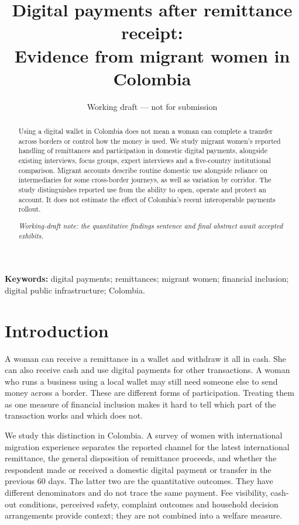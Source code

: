 \documentclass[12pt]{article}
\title{Digital payments after remittance receipt:\\ Evidence from migrant women in Colombia}
\author{}
\date{Working draft --- not for submission}
\begin{document}
\maketitle
\begin{abstract}
Using a digital wallet in Colombia does not mean a woman can complete a transfer across borders or control how the money is used. We study migrant women's reported handling of remittances and participation in domestic digital payments, alongside existing interviews, focus groups, expert interviews and a five-country institutional comparison. Migrant accounts describe routine domestic use alongside reliance on intermediaries for some cross-border journeys, as well as variation by corridor. The study distinguishes reported use from the ability to open, operate and protect an account. It does not estimate the effect of Colombia's recent interoperable payments rollout.
\par\smallskip
\emph{Working-draft note: the quantitative findings sentence and final abstract await accepted exhibits.}
\end{abstract}
\noindent\textbf{Keywords:} digital payments; remittances; migrant women; financial inclusion; digital public infrastructure; Colombia.

\section{Introduction}
A woman can receive a remittance in a wallet and withdraw it all in cash. She can also receive cash and use digital payments for other transactions. A woman who runs a business using a local wallet may still need someone else to send money across a border. These are different forms of participation. Treating them as one measure of financial inclusion makes it hard to tell which part of the transaction works and which does not.

We study this distinction in Colombia. A survey of women with international migration experience separates the reported channel for the latest international remittance, the general disposition of remittance proceeds, and whether the respondent made or received a domestic digital payment or transfer in the previous 60 days. The latter two are the quantitative outcomes. They have different denominators and do not trace the same payment. Fee visibility, cash-out conditions, perceived safety, complaint outcomes and household decision arrangements provide context; they are not combined into a welfare measure.
\end{document}
